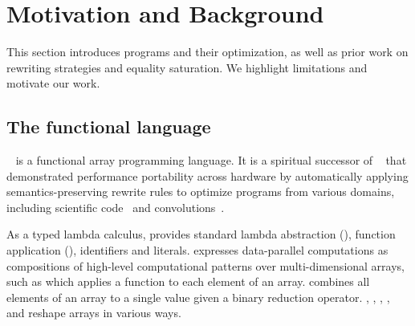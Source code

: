 \section{Motivation and Background}
\label{background}

This section introduces \Rise{} programs and their optimization, as well as prior work on \Elevate{} rewriting strategies and equality saturation.
We highlight limitations and motivate our work.

\subsection{The \Rise{} functional language}
\label{rise}

\Rise{}~\cite{hagedorn2020-elevate} is a functional array programming language.
It is a spiritual successor of \Lift{}~\cite{lift-rewrite-2015,lift-ir-2017} that demonstrated performance portability across hardware by automatically applying semantics-preserving rewrite rules to optimize programs from various domains, including scientific code~\cite{lift-stencil-2018} and convolutions~\cite{mogers2020-convolution}.

As a typed lambda calculus, \Rise{} provides standard lambda abstraction (), function application (), identifiers and literals.
\Rise{} expresses data-parallel computations as compositions of high-level computational patterns over multi-dimensional arrays, such as
 which applies a function to each element of an array.
 combines all elements of an array to a single value given a binary reduction operator.
, , , ,  and  reshape arrays in various ways.

